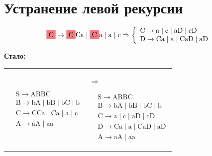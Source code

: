 \documentclass[12pt,onecolumn]{article}
\newcommand{\hlr}[1]{
  \colorbox{Salmon}{#1}
}
\newcommand{\chtb}[4]{
  \begin{center}
    \textbf{#2}
  \end{center}
  \begin{center}
    \begin{tabularx}{#1}{X|X}
    $\begin{aligned}
          #3
      \end{aligned}$ &
    \begin{minipage}{1em}
      $\Rightarrow$
    \end{minipage}
    $\begin{aligned}
         #4
      \end{aligned}$
    \end{tabularx}
  \end{center}
}
\begin{document}
\section*{Устранение левой рекурсии}

\begin{equation*}
    \mathrm{\hlr{C}} \rightarrow \mathrm{\hlr{C}Ca}\mid \mathrm{\hlr{C}a}\mid \mathrm{a} \mid \mathrm{c} \Rightarrow
    \left\{
    \begin{array}{l}
        \mathrm{C} \to \mathrm{a} \mid \mathrm{c} \mid \mathrm{aD} \mid \mathrm{cD}   \\
        \mathrm{D} \to \mathrm{Ca} \mid \mathrm{a} \mid \mathrm{CaD} \mid \mathrm{aD} \\
    \end{array}
    \right.
\end{equation*}

\chtb{0.7\textwidth}
{Стало:}
{
    & \mathrm{S} \rightarrow \mathrm{A B B C}                                                \\
    & \mathrm{B} \rightarrow \mathrm{b A}\mid \mathrm{b B} \mid \mathrm{b C} \mid \mathrm{b} \\
    & \mathrm{C} \rightarrow \mathrm{CCa}\mid \mathrm{Ca}\mid \mathrm{a} \mid \mathrm{c}    \\
    & \mathrm{A} \rightarrow \mathrm{aA} \mid \mathrm{aa}
}
{
    & \mathrm{S} \rightarrow \mathrm{A B B C}                                            \\
    & \mathrm{B} \rightarrow \mathrm{b A}\mid \mathrm{b B} \mid \mathrm{b C} \mid \mathrm{b} \\
    & \mathrm{C} \rightarrow \mathrm{a} \mid \mathrm{c} \mid \mathrm{aD} \mid \mathrm{cD} \\
    & \mathrm{D} \rightarrow \mathrm{Ca} \mid \mathrm{a} \mid \mathrm{CaD} \mid \mathrm{aD} \\
    & \mathrm{A} \rightarrow \mathrm{aA} \mid \mathrm{aa}
}
\end{document}
